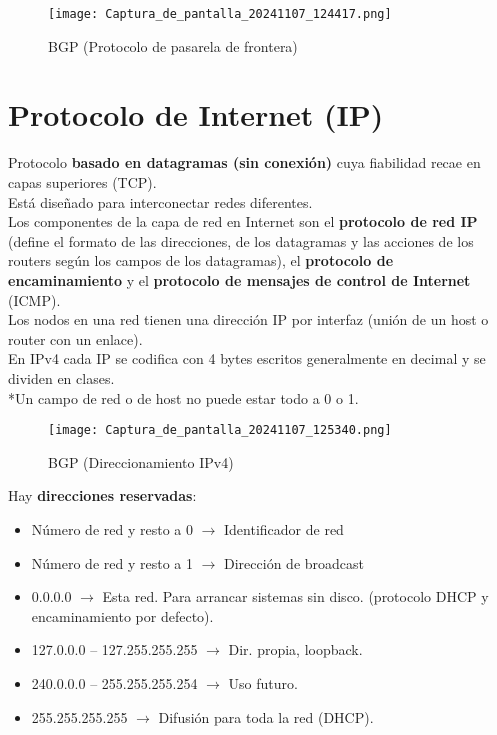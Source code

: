 \documentclass{article}
\begin{document}
\begin{figure}[h]
    \centering
    \texttt{[image: Captura\_de\_pantalla\_20241107\_124417.png]}
    \caption{BGP (Protocolo de pasarela de frontera)}
    \label{fig:etiqueta}
\end{figure}

\newpage

\section{Protocolo de Internet (IP)}
Protocolo \textbf{basado en datagramas (sin conexión)} cuya fiabilidad recae en capas superiores (TCP). \\
Está diseñado para interconectar redes diferentes. \\
Los componentes de la capa de red en Internet son el \textbf{protocolo de red IP} (define el formato de las
direcciones, de los datagramas y las acciones de los routers según los campos de los datagramas), el
\textbf{protocolo de encaminamiento} y el \textbf{protocolo de mensajes de control de Internet} (ICMP). \\
Los nodos en una red tienen una dirección IP por interfaz (unión de un host o router con un enlace). \\
En IPv4 cada IP se codifica con 4 bytes escritos generalmente en decimal y se dividen en clases. \\
*Un campo de red o de host no puede estar todo a 0 o 1. \\

\begin{figure}[h]
    \centering
    \texttt{[image: Captura\_de\_pantalla\_20241107\_125340.png]}
    \caption{BGP (Direccionamiento IPv4)}
    \label{fig:etiqueta}
\end{figure}

Hay \textbf{direcciones reservadas}: 
\begin{itemize}
    \item Número de red y resto a 0 $\xrightarrow{}$ Identificador de red
    \item Número de red y resto a 1 $\xrightarrow{}$ Dirección de broadcast
    \item 0.0.0.0 $\xrightarrow{}$ Esta red. Para arrancar sistemas sin disco. (protocolo DHCP y encaminamiento por defecto).
    \item 127.0.0.0 – 127.255.255.255 $\xrightarrow{}$ Dir. propia, loopback.
    \item 240.0.0.0 – 255.255.255.254 $\xrightarrow{}$ Uso futuro.
    \item 255.255.255.255 $\xrightarrow{}$ Difusión para toda la red (DHCP).
\end{itemize}
\end{document}

